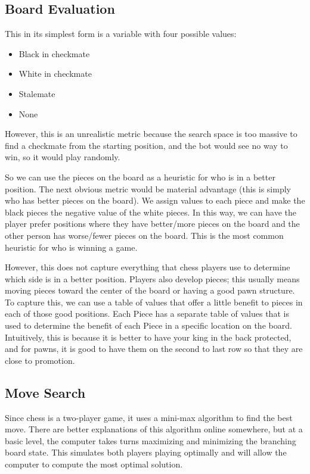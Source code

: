 \documentclass[sigconf]{acmart}
\begin{document}
\subsection{Board Evaluation}
This in its simplest form is a variable with four possible values:
\begin{itemize}
    \item Black in checkmate
    \item White in checkmate
    \item Stalemate
    \item None
\end{itemize}
However, this is an unrealistic metric because the search space is too massive to find a checkmate from the starting position, and the bot would see no way to win, so it would play randomly.

So we can use the pieces on the board as a heuristic for who is in a better position.
The next obvious metric would be material advantage (this is simply who has better pieces on the board).
We assign values to each piece and make the black pieces the negative value of the white pieces.
In this way, we can have the player prefer positions where they have better/more pieces on the board and the other person has worse/fewer pieces on the board.
This is the most common heuristic for who is winning a game.

However, this does not capture everything that chess players use to determine which side is in a better position.
Players also develop pieces; this usually means moving pieces toward the center of the board or having a good pawn structure.
To capture this, we can use a table of values that offer a little benefit to pieces in each of those good positions.
Each Piece has a separate table of values that is used to determine the benefit of each Piece in a specific location on the board.
Intuitively, this is because it is better to have your king in the back protected, and for pawns, it is good to have them on the second to last row so that they are close to promotion.

\subsection{Move Search}
Since chess is a two-player game, it uses a mini-max algorithm to find the best move.
There are better explanations of this algorithm online somewhere, but at a basic level, the computer takes turns maximizing and minimizing the branching board state. 
This simulates both players playing optimally and will allow the computer to compute the most optimal solution.
\end{document}
